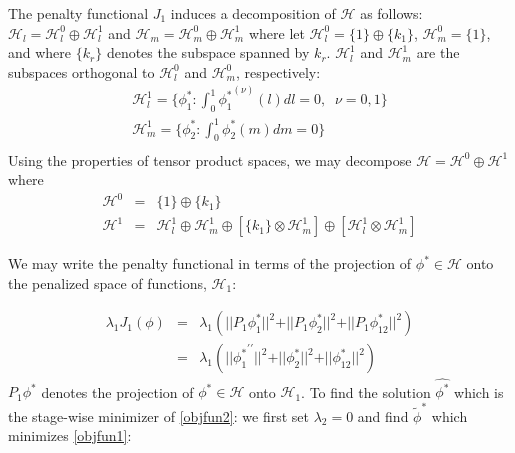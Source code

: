 \documentclass[12pt]{article}
\begin{document}
%
 \noindent
The penalty functional $J_1$ induces a decomposition of $\mathcal{H}$ as follows: $\mathcal{H}_l = \mathcal{H}_l^0 \oplus \mathcal{H}_l^1$ and $\mathcal{H}_m = \mathcal{H}_m^0 \oplus \mathcal{H}_m^1$ where let $\mathcal{H}_l^0 =  \lbrace 1 \rbrace \oplus \lbrace k_1 \rbrace$, $\mathcal{H}_m^0 =  \lbrace  1 \rbrace$, and where $\lbrace k_r \rbrace$ denotes the subspace spanned by $k_r$. $\mathcal{H}_l^1$ and $\mathcal{H}_m^1$ are the subspaces orthogonal to $\mathcal{H}_l^0$ and $\mathcal{H}_m^0$, respectively:
\begin{eqnarray*}
\mathcal{H}_l^1 = \lbrace \phi^*_1: \int_0^1 {\phi_1^*}^{\left( \nu \right)}\left(l\right) dl = 0,\;\; \nu = 0,1\rbrace\\
\mathcal{H}_m^1 = \lbrace \phi^*_2: \int_0^1 \phi_2^* \left(m\right) dm = 0 \rbrace\\
\end{eqnarray*}
\noindent
Using the properties of tensor product spaces, we may decompose $\mathcal{H} = \mathcal{H}^0\oplus \mathcal{H}^1$ where
\begin{eqnarray*}
\mathcal{H}^0 &=& \lbrace 1 \rbrace \oplus \lbrace k_1 \rbrace\\
\mathcal{H}^1 &=& \mathcal{H}_l^1 \oplus \mathcal{H}_m^1 \oplus  \left[ \lbrace k_1 \rbrace  \otimes  \mathcal{H}_m^1 \right]  \oplus  \left[\mathcal{H}_l^1 \otimes  \mathcal{H}_m^1\right]   
\end{eqnarray*}

We may write the penalty functional in terms of the projection of $\phi^* \in \mathcal{H}$ onto the penalized space of functions, $\mathcal{H}_1$:

\begin{eqnarray} 
\lambda_1 J_1\left(\phi\right) &=& \lambda_1 \left(\vert \vert {P_1 \phi_1^*} \vert \vert^2 + \vert \vert {P_1 \phi_2^*} \vert \vert^2 + \vert \vert {P_1 \phi_{12}^*} \vert \vert^2 \right)\\
&=& \lambda_1 \left(\vert \vert {\phi_1^*}^{\prime \prime} \vert \vert^2 + \vert \vert {\phi_2^*} \vert \vert^2 + \vert \vert {\phi_{12}^*} \vert \vert^2 \right) \label{nonstapen}
\end{eqnarray} 
 \noindent
$P_1 \phi^*$ denotes the projection of $\phi^* \in \mathcal{H}$ onto $\mathcal{H}_1$. To find the solution $\hat{\phi^*}$ which is the stage-wise minimizer of \eqref{objfun2}: we first set $\lambda_2 = 0$ and find $\tilde{\phi}^*$ which minimizes \eqref{objfun1}:
\end{document}
